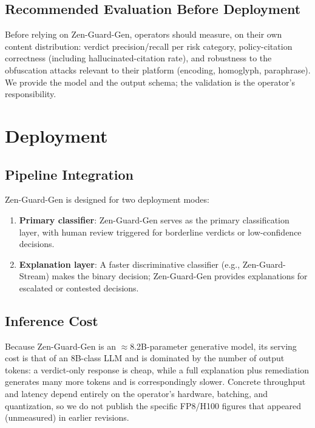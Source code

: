 \documentclass[11pt,a4paper]{article}
\begin{document}
\subsection{Recommended Evaluation Before Deployment}
\label{sec:limitations-eval}

Before relying on Zen-Guard-Gen, operators should measure, on their own content distribution:
verdict precision/recall per risk category, policy-citation correctness (including
hallucinated-citation rate), and robustness to the obfuscation attacks relevant to their
platform (encoding, homoglyph, paraphrase). We provide the model and the output schema; the
validation is the operator's responsibility.

\section{Deployment}

\subsection{Pipeline Integration}

Zen-Guard-Gen is designed for two deployment modes:

\begin{enumerate}
  \item \textbf{Primary classifier}: Zen-Guard-Gen serves as the primary classification layer, with human review triggered for borderline verdicts or low-confidence decisions.
  \item \textbf{Explanation layer}: A faster discriminative classifier (e.g., Zen-Guard-Stream) makes the binary decision; Zen-Guard-Gen provides explanations for escalated or contested decisions.
\end{enumerate}

\subsection{Inference Cost}

Because Zen-Guard-Gen is an $\approx$8.2B-parameter generative model, its serving cost is that
of an 8B-class LLM and is dominated by the number of output tokens: a verdict-only response is
cheap, while a full explanation plus remediation generates many more tokens and is
correspondingly slower. Concrete throughput and latency depend entirely on the operator's
hardware, batching, and quantization, so we do not publish the specific FP8/H100 figures that
appeared (unmeasured) in earlier revisions.
\end{document}
